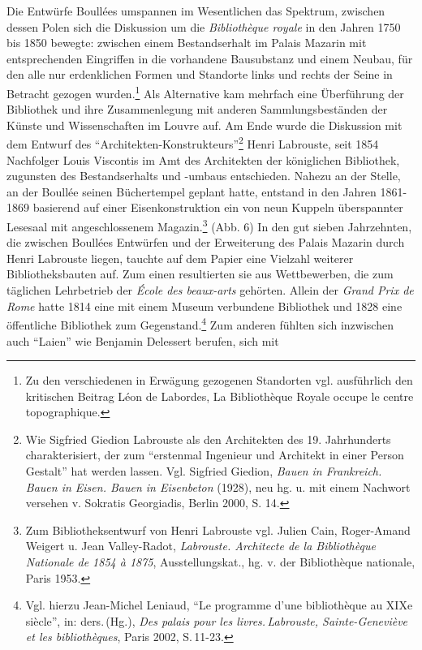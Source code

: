 Die Entwürfe Boullées umspannen im Wesentlichen das Spektrum, zwischen
dessen Polen sich die Diskussion um die \emph{Bibliothèque royale} in
den Jahren 1750 bis 1850 bewegte: zwischen einem Bestandserhalt im
Palais Mazarin mit entsprechenden Eingriffen in die vorhandene
Bausubstanz und einem Neubau, für den alle nur erdenklichen Formen und
Standorte links und rechts der Seine in Betracht gezogen
wurden.\footnote{Zu den verschiedenen in Erwägung gezogenen Standorten
  vgl. ausführlich den kritischen Beitrag Léon de Labordes, La
  Bibliothèque Royale occupe le centre topographique.} Als Alternative
kam mehrfach eine Überführung der Bibliothek und ihre Zusammenlegung mit
anderen Sammlungsbeständen der Künste und Wissenschaften im Louvre auf.
Am Ende wurde die Diskussion mit dem Entwurf des
\enquote{Architekten-Konstrukteurs}\footnote{Wie Sigfried Giedion
  Labrouste als den Architekten des 19. Jahrhunderts charakterisiert,
  der zum \enquote{erstenmal Ingenieur und Architekt in einer Person
  Gestalt} hat werden lassen. Vgl. Sigfried Giedion, \emph{Bauen in
  Frankreich. Bauen in Eisen. Bauen in Eisenbeton} (1928), neu hg. u.
  mit einem Nachwort versehen v. Sokratis Georgiadis, Berlin 2000, S.
  14.} Henri Labrouste, seit 1854 Nachfolger Louis Viscontis im Amt des
Architekten der königlichen Bibliothek, zugunsten des Bestandserhalts
und -umbaus entschieden. Nahezu an der Stelle, an der Boullée seinen
Büchertempel geplant hatte, entstand in den Jahren 1861-1869 basierend
auf einer Eisenkonstruktion ein von neun Kuppeln überspannter Lesesaal
mit angeschlossenem Magazin.\footnote{Zum Bibliotheksentwurf von Henri
  Labrouste vgl. Julien Cain, Roger-Amand Weigert u. Jean Valley-Radot,
  \emph{Labrouste. Architecte de la Bibliothèque Nationale de 1854 à
  1875}, Ausstellungskat., hg. v. der Bibliothèque nationale, Paris
  1953.} (Abb. 6) In den gut sieben Jahrzehnten, die zwischen Boullées
Entwürfen und der Erweiterung des Palais Mazarin durch Henri Labrouste
liegen, tauchte auf dem Papier eine Vielzahl weiterer Bibliotheksbauten
auf. Zum einen resultierten sie aus Wettbewerben, die zum täglichen
Lehrbetrieb der \emph{École des beaux-arts} gehörten. Allein der
\emph{Grand Prix de Rome} hatte 1814 eine mit einem Museum verbundene
Bibliothek und 1828 eine öffentliche Bibliothek zum
Gegenstand.\footnote{Vgl. hierzu Jean-Michel Leniaud, \enquote{Le
  programme d'une bibliothèque au XIXe siècle}, in: ders.\,(Hg.),
  \emph{Des palais pour les livres.\,Labrouste, Sainte-Geneviève et les
  bibliothèques}, Paris 2002, S.\,11-23.} Zum anderen fühlten sich
inzwischen auch \enquote{Laien} wie Benjamin Delessert berufen, sich mit
